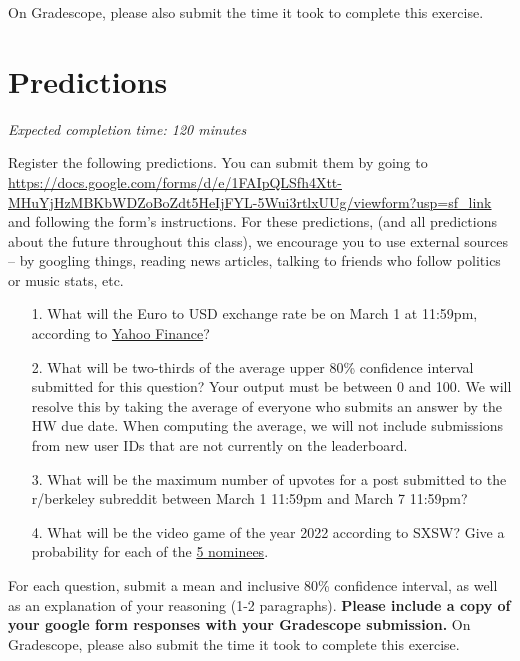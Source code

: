\documentclass[11pt]{article}
\begin{document}
On Gradescope, please also submit the time it took to complete this exercise.

\section*{Predictions}

\emph{Expected completion time: 120 minutes}

Register the following predictions. You can submit them by going to \url{https://docs.google.com/forms/d/e/1FAIpQLSfh4Xtt-MHuYjHzMBKbWDZoBoZdt5HeIjFYL-5Wui3rtlxUUg/viewform?usp=sf_link} and following the form's instructions. For these predictions, (and all predictions about the future throughout this class), we encourage you to use external sources -- by googling things, reading news articles, talking to friends who follow politics or music stats, etc.

\begin{enumerate}
	\item[1.] What will the Euro to USD exchange rate be on March 1 at 11:59pm, according to \href{https://finance.yahoo.com/quote/EURUSD=X/?}{Yahoo Finance}?
	
	\item[2.] What will be two-thirds of the average upper 80\% confidence interval submitted for this question? Your output must be between 0 and 100. We will resolve this by taking the average of everyone who submits an answer by the HW due date. When computing the average, we will not include submissions from new user IDs that are not currently on the leaderboard.
	
	\item[3.] What will be the maximum number of upvotes for a post submitted to the r/berkeley subreddit between March 1 11:59pm and March 7 11:59pm?
	
	\item[4.] What will be the video game of the year 2022 according to SXSW? Give a probability for each of the \href{https://www.sxsw.com/awards/gaming-awards/?}{5 nominees}.
\end{enumerate}

For each question, submit a mean and inclusive 80\% confidence interval, as well as an explanation of your reasoning (1-2 paragraphs). \textbf{Please include a copy of your google form responses with your Gradescope submission.} On Gradescope, please also submit the time it took to complete this exercise.
\end{document}
